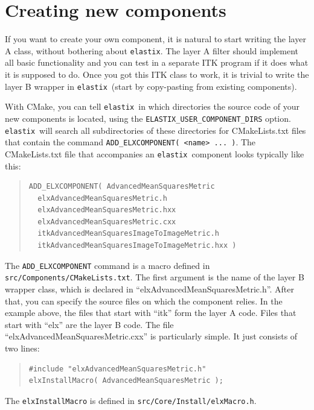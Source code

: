 \documentclass[]{report}
\newcommand{\elastix}{\texttt{elastix}}
\begin{document}
\section{Creating new components}\label{sec:dev:newcomp}

If you want to create your own component, it is natural to start writing the
layer A class, without bothering about \elastix. The layer A filter should
implement all basic functionality and you can test in a separate ITK program if
it does what it is supposed to do. Once you got this ITK class to work, it is
trivial to write the layer B wrapper in \elastix\ (start by copy-pasting from
existing components).

With CMake, you can tell \elastix\ in which directories the source code of your
new components is located, using the \texttt{ELASTIX\_USER\_COMPONENT\_DIRS}
option. \elastix\ will search all subdirectories of these directories for
CMakeLists.txt files that contain the command \texttt{ADD\_ELXCOMPONENT( <name>
... )}. The CMakeLists.txt file that accompanies an \elastix\ component looks
typically like this:
\begin{quote}
\begin{verbatim}
ADD_ELXCOMPONENT( AdvancedMeanSquaresMetric
  elxAdvancedMeanSquaresMetric.h
  elxAdvancedMeanSquaresMetric.hxx
  elxAdvancedMeanSquaresMetric.cxx
  itkAdvancedMeanSquaresImageToImageMetric.h
  itkAdvancedMeanSquaresImageToImageMetric.hxx )
 \end{verbatim}
 \end{quote}
The \texttt{ADD\_ELXCOMPONENT} command is a macro defined in
\texttt{src/Components/CMakeLists.txt}. The first argument is the name of the
layer B wrapper class, which is declared in ``elxAdvancedMeanSquaresMetric.h''.
After that, you can specify the source files on which the component relies. In
the example above, the files that start with ``itk'' form the layer A code.
Files that start with ``elx'' are the layer B code. The file
``elxAdvancedMeanSquaresMetric.cxx'' is particularly simple. It just consists
of two lines:
\begin{quote}
\begin{verbatim}
#include "elxAdvancedMeanSquaresMetric.h"
elxInstallMacro( AdvancedMeanSquaresMetric );
\end{verbatim}
\end{quote}
The \texttt{elxInstallMacro} is defined in
\texttt{src/Core/Install/elxMacro.h}.
\end{document}
